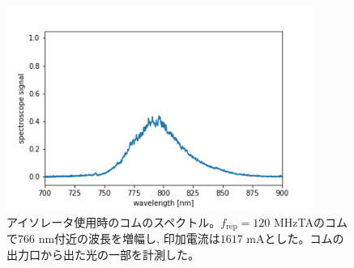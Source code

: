 \documentclass[uplatex, dvipdfmx, a4paper, report, papersize, 11pt]{jsbook}
\begin{document}
\begin{figure}[H]
 \begin{center}
  \includegraphics[width=100mm]{figures/chapter4/comb-spectrum_no-return.png}
\end{center}
 \caption{アイソレータ使用時のコムのスペクトル。$f_{\mathrm{rep}} = 120$ MHzTAのコムで$766$ nm付近の波長を増幅し, 印加電流は$1617$ mAとした。コムの出力口から出た光の一部を計測した。}
 \label{spectrum_current_isolator}
\end{figure}
\end{document}
